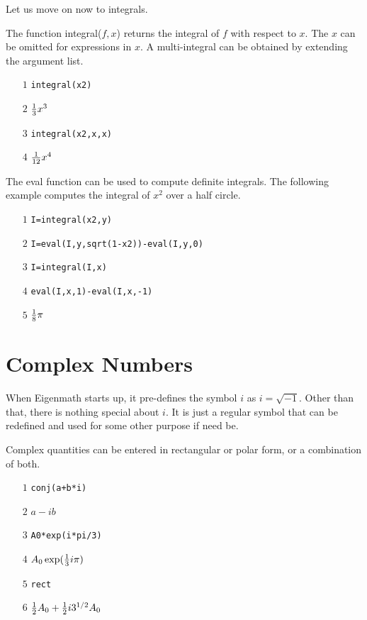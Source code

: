 \documentclass[12pt,openany]{report}
\begin{document}
\newpage

\label{integral}

\noindent
Let us move on now to integrals.

\medskip
\noindent
The function integral($f,x$) returns the integral of $f$ with respect to $x$.
The $x$ can be omitted for expressions in $x$.
A multi-integral can be obtained by extending the argument list.
\begin{itemize}
\item[$\scriptstyle1$]{\tt integral(x{}2)}
\item[$\scriptstyle2$]\hspace{50pt} ${1\over3}x^3$
\item[$\scriptstyle3$]{\tt integral(x{}2,x,x)}
\item[$\scriptstyle4$]\hspace{50pt} ${1\over12}x^4$
\end{itemize}
The eval function can be used to compute definite integrals.
The following example computes the integral of $x^2$
over a half circle.
\begin{itemize}
\item[$\scriptstyle1$]{\tt I=integral(x{}2,y)}
\item[$\scriptstyle2$]{\tt I=eval(I,y,sqrt(1-x{}2))-eval(I,y,0)}
\item[$\scriptstyle3$]{\tt I=integral(I,x)}
\item[$\scriptstyle4$]{\tt eval(I,x,1)-eval(I,x,-1)}
\item[$\scriptstyle5$]\hspace{50pt} ${1\over8}\pi$
\end{itemize}

\newpage

\chapter{Complex Numbers}

\noindent
When Eigenmath starts up, it pre-defines the symbol $i$ as $i=\sqrt{-1}$.
Other than that, there is nothing special about $i$.
It is just a regular symbol that can be redefined and used for some other purpose if need be.

\medskip
\noindent
Complex quantities can be entered in rectangular or polar form, or a combination of both.
\begin{itemize}
\item[$\scriptstyle1$]{\tt conj(a+b*i)}
\item[$\scriptstyle2$]\hspace{50pt} $a-ib$
\item[$\scriptstyle3$]{\tt A0*exp(i*pi/3)}
\item[$\scriptstyle4$]\hspace{50pt} $A_0\exp({1\over3}i\pi)$
\item[$\scriptstyle5$]{\tt rect}
\item[$\scriptstyle6$]\hspace{50pt} ${1\over2}A_0+{1\over2}i3^{1/2}A_0$
\end{itemize}
\end{document}
